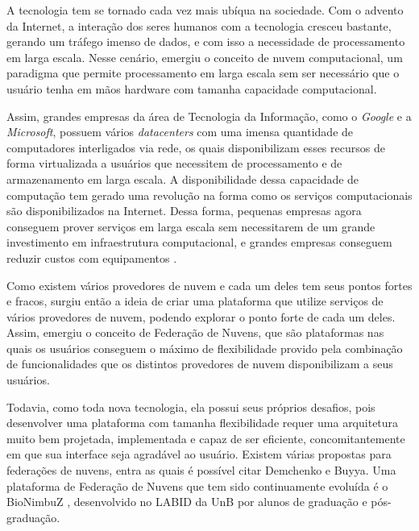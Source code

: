 A tecnologia tem se tornado cada vez mais ubíqua na sociedade. Com o advento da Internet, a interação dos seres humanos com a tecnologia cresceu bastante, gerando um tráfego imenso de dados, e com isso a necessidade de processamento em larga escala. Nesse cenário, emergiu o conceito de nuvem computacional, um paradigma que permite processamento em larga escala sem ser necessário que o usuário tenha em mãos hardware com tamanha capacidade computacional.

Assim, grandes empresas da área de Tecnologia da Informação, como o \textit{Google}\cite{Google} e a \textit{Microsoft}\cite{Microsoft}, possuem vários \textit{datacenters} com uma imensa quantidade de computadores interligados via rede, os quais disponibilizam esses recursos de forma virtualizada a usuários que necessitem de processamento e de armazenamento em larga escala. A disponibilidade dessa capacidade de computação tem gerado uma revolução na forma como os serviços computacionais são disponibilizados na Internet.
Dessa forma, pequenas empresas agora conseguem prover serviços em larga escala sem necessitarem de um grande investimento em infraestrutura computacional, e grandes empresas conseguem reduzir custos com equipamentos \cite{WhatIsCloudComputing}.

Como existem vários provedores de nuvem e cada um deles tem seus pontos fortes e fracos, surgiu então a ideia de criar uma plataforma que utilize serviços de vários provedores de nuvem, podendo explorar o ponto forte de cada um deles. Assim, emergiu o conceito de Federação de Nuvens\cite{6427607}, que são plataformas nas quais os usuários conseguem o máximo de flexibilidade provido pela combinação de funcionalidades que os distintos provedores de nuvem disponibilizam a seus usuários.

Todavia, como toda nova tecnologia, ela possui seus próprios desafios, pois desenvolver uma plataforma com tamanha flexibilidade requer uma arquitetura muito bem projetada, implementada e capaz de ser eficiente, concomitantemente em que sua interface seja agradável ao usuário. Existem várias propostas para federações de nuvens, entra as quais é possível citar Demchenko\cite{6427607} e Buyya\cite{Buyya:2010:IUF:2143583.2143586}. Uma plataforma de Federação de Nuvens que tem sido continuamente evoluída é o BioNimbuZ \cite{BioNimbuZ_Breno_Deric} \cite{BioNimbuZ_Closer} \cite{BioNimbuZ_6846526} \cite{Saldanha2012} \cite{6732620_BioNimbuZ_ACOsched} \cite{BioNimbuZ_Willian_C99} \cite{closer12_BioNimbuZ_AHP} \cite{Saldanha_BioNimbus}, desenvolvido no \acrfull{LABID} da \acrfull{UnB} por alunos de graduação e pós-graduação.

